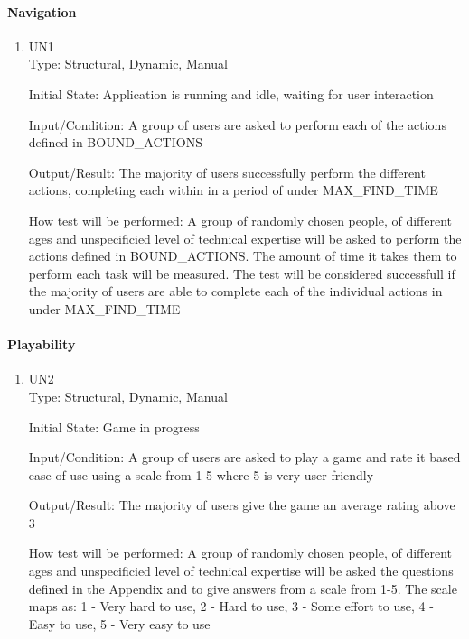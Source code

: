 \documentclass[12pt, titlepage]{article}
\begin{document}
	\paragraph{Navigation}
	\begin{enumerate}
		\item{UN1\\}
		Type: Structural, Dynamic, Manual
		
		Initial State: Application is running and idle, waiting for user interaction
		
		Input/Condition: A group of users are asked to perform each of the actions
		defined in BOUND\_ACTIONS
		
		Output/Result: The majority of users successfully perform the different
		actions, completing each within in a period of under MAX\_FIND\_TIME
		
		How test will be performed: A group of randomly chosen people, of different
		ages and unspecificied level of technical expertise will be asked to perform
		the actions defined in BOUND\_ACTIONS. The amount of time it takes them
		to perform each task will be measured. The test will be considered successfull
		if the majority of users are able to complete each of the individual actions
		in under MAX\_FIND\_TIME		
	\end{enumerate}

	\paragraph{Playability}
	\begin{enumerate}
		\item{UN2\\}
		Type: Structural, Dynamic, Manual
		
		Initial State: Game in progress
		
		Input/Condition: A group of users are asked to play a game and rate it based
		ease of use using a scale from 1-5 where 5 is very user friendly
		
		Output/Result: The majority of users give the game an average rating above 3
		
		How test will be performed: A group of randomly chosen people, of different
		ages and unspecificied level of technical expertise will be asked the
		questions defined in the Appendix and to give answers
		from a scale from 1-5. The scale maps as: 1 - Very hard to use, 2 - Hard to
		use, 3 - Some effort to use, 4 - Easy to use, 5 - Very easy to use		
	\end{enumerate}
\end{document}
